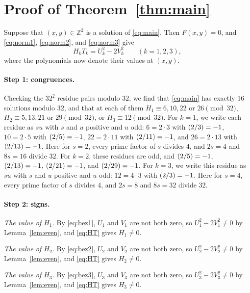 \documentclass[11pt]{article}
\newcommand{\Z}{\mathbb{Z}}
\newcommand{\leg}[2]{\mathchoice{\biggl(\dfrac{#1}{#2}\biggr)}{(#1/#2)}{(#1/#2)}{(#1/#2)}}
\begin{document}
\section{Proof of Theorem~\ref{thm:main}}

Suppose that $(x,y)\in\Z^2$ is a solution of \eqref{eq:main}. Then $F(x,y)=0$, and \eqref{eq:norm1}, \eqref{eq:norm2}, and \eqref{eq:norm3} give
\begin{equation}\label{eq:HT}
H_kT_k=U_k^2-2V_k^2\qquad(k=1,2,3),
\end{equation}
where the polynomials now denote their values at $(x,y)$.

\paragraph{Step 1: congruences.} Checking the $32^2$ residue pairs modulo $32$, we find that \eqref{eq:main} has exactly 16 solutions modulo $32$, and that at each of them $H_{1}\equiv6,\allowbreak 10,\allowbreak 22\text{ or }26\pmod{32}$, $H_{2}\equiv5,\allowbreak 13,\allowbreak 21\text{ or }29\pmod{32}$, or $H_{3}\equiv12\pmod{32}$. For $k=1$, we write each residue as $su$ with $s$ and $u$ positive and $u$ odd: $6=2\cdot3$ with $\leg{2}{3}=-1$, $10=2\cdot5$ with $\leg{2}{5}=-1$, $22=2\cdot11$ with $\leg{2}{11}=-1$, and $26=2\cdot13$ with $\leg{2}{13}=-1$. Here for $s=2$, every prime factor of $s$ divides $4$, and $2s=4$ and $8s=16$ divide $32$. For $k=2$, these residues are odd, and $\leg{2}{5}=-1$, $\leg{2}{13}=-1$, $\leg{2}{21}=-1$, and $\leg{2}{29}=-1$. For $k=3$, we write this residue as $su$ with $s$ and $u$ positive and $u$ odd: $12=4\cdot3$ with $\leg{2}{3}=-1$. Here for $s=4$, every prime factor of $s$ divides $4$, and $2s=8$ and $8s=32$ divide $32$.

\paragraph{Step 2: signs.} \emph{The value of $H_{1}$.} By \eqref{eq:bez1}, $U_{1}$ and $V_{1}$ are not both zero, so $U_{1}^2-2V_{1}^2\neq0$ by Lemma~\ref{lem:even}, and \eqref{eq:HT} gives $H_{1}\neq0$.

\emph{The value of $H_{2}$.} By \eqref{eq:bez2}, $U_{2}$ and $V_{2}$ are not both zero, so $U_{2}^2-2V_{2}^2\neq0$ by Lemma~\ref{lem:even}, and \eqref{eq:HT} gives $H_{2}\neq0$.

\emph{The value of $H_{3}$.} By \eqref{eq:bez3}, $U_{3}$ and $V_{3}$ are not both zero, so $U_{3}^2-2V_{3}^2\neq0$ by Lemma~\ref{lem:even}, and \eqref{eq:HT} gives $H_{3}\neq0$.
\end{document}
